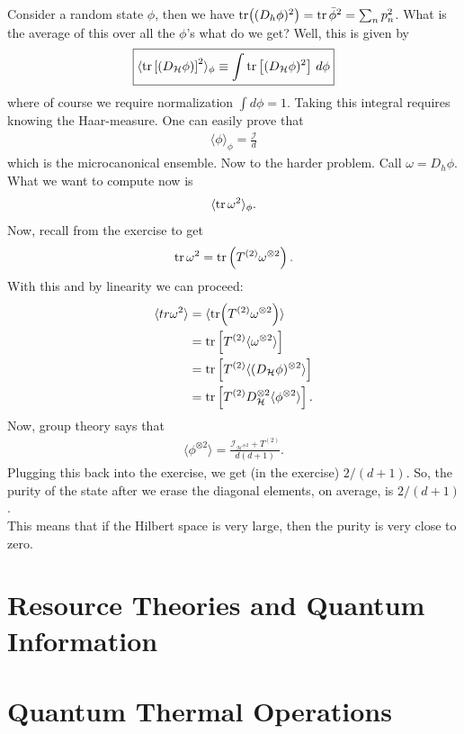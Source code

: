\documentclass{book}
\theoremstyle{definition}
\newcommand{\nn}{\nonumber}
\newcommand{\had}{\mathcal{H}}
\newcommand{\f}[2]{\frac{#1}{#2}}
\newcommand{\lp}{\left(}
\newcommand{\rp}{\right)}
\newcommand{\lb}{\left[}
\newcommand{\rb}{\right]}
\newcommand{\la}{\langle}
\newcommand{\ra}{\rangle}
\newcommand{\Id}{\mathcal{I}}
\begin{document}
Consider a random state $\phi$, then we have $\tr((D_h\phi)^2)=  \tr \bar{\phi}^2 = \sum_n p_n^2$.  What is the average of this over all the $\phi$'s what do we get? Well, this is given by
\begin{align}
\boxed{  \la \tr\lb (D_\had \phi)\rb^2  \ra_\phi \equiv \int \tr\lb (D_\had \phi)^2 \rb \,d\phi} 
\end{align}
where of course we require normalization $\int d\phi = 1$. Taking this integral requires knowing the Haar-measure. One can easily prove that
\begin{align}
\la \phi \ra_\phi = \f{\Id}{d}
\end{align} 
which is the microcanonical ensemble. Now to the harder problem. Call $\omega = D_h \phi$. What we want to compute now is 
\begin{align}
\la \tr \omega^2 \ra_\phi.
\end{align}
Now, recall from the exercise to get
\begin{align}
\tr \omega^2 = \tr\lp T^{(2)} \omega^{\otimes 2} \rp.
\end{align}
With this and by linearity we can proceed:
\begin{align}
\la tr\omega^2 \ra &= \la \tr(T^{(2)} \omega^{\otimes 2}) \ra\nn\\
&= \tr \lb T^{(2)} \la \omega^{\otimes 2} \ra \rb\nn\\
&= \tr\lb T^{(2)} \la (D_\had \phi)^{\otimes 2} \ra \rb\nn\\
&= \tr\lb T^{(2)} D_\had^{\otimes 2} \la \phi^{\otimes 2} \ra \rb.
\end{align}
Now, group theory says that
\begin{align}
\la \phi^{\otimes 2}  \ra = \f{\Id_{\had^{\otimes 2}} + T^{(2)}}{d(d+1)}.
\end{align}
Plugging this back into the exercise, we get (in the exercise) $2/(d+1)$. So, the purity of the state after we erase the diagonal elements, on average, is $2/(d+1)$. \\

This means that if the Hilbert space is very large, then the purity is very close to zero. 

\newpage

\section{Resource Theories and Quantum Information}


\newpage
\section{Quantum Thermal Operations}
\end{document}
